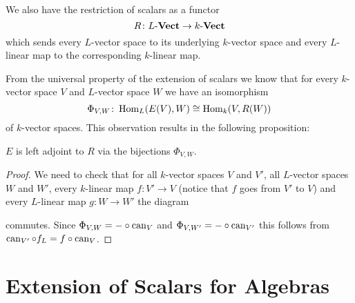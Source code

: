 We also have the restriction of scalars as a functor
\[
  R \colon L\text{-}\mathbf{Vect} \to k\text{-}\mathbf{Vect}
\]
which sends every $L$-vector space to its underlying $k$-vector space and every $L$-linear map to the corresponding $k$-linear map.
  
From the universal property of the extension of scalars we know that for every $k$-vector space $V$ and $L$-vector space $W$ we have an isomorphism
\[
          \Phi_{V,W}
  \colon  \operatorname{Hom}_L(E(V),W)
  \cong   \operatorname{Hom}_k(V,R(W))
\]
of $k$-vector spaces.
This observation results in the following proposition:
  
\begin{proposition}
  $E$ is left adjoint to $R$ via the bijections $\Phi_{V,W}$.
\end{proposition}
\begin{proof}
  We need to check that for all $k$-vector spaces $V$ and $V'$, all $L$-vector spaces $W$ and $W'$, every $k$-linear map $f \colon V' \to V$ (notice that $f$ goes from $V'$ to $V$) and every $L$-linear map $g \colon W \to W'$ the diagram
  \begin{center}
  \end{center}
  commutes.
  Since $\Phi_{V,W} = - \circ \operatorname{can}_V$ and $\Phi_{V,W'} = - \circ \operatorname{can}_{V'}$ this follows from $\operatorname{can}_{V'} \circ f_L = f \circ \operatorname{can}_V$.
\end{proof}





\section{Extension of Scalars for Algebras}


